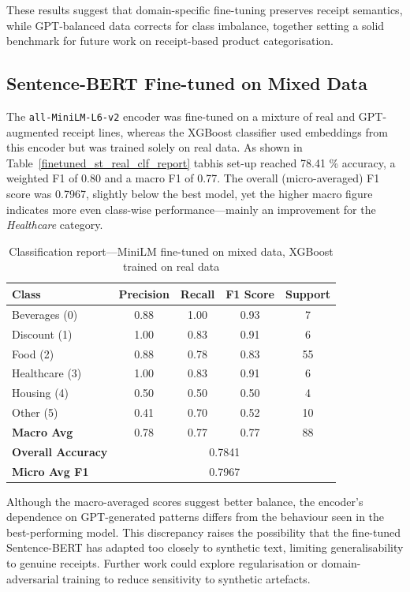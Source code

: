 \documentclass{SGGW-thesis-EN}
\begin{document}
\noindent
These results suggest that domain-specific fine-tuning preserves receipt semantics, while GPT-balanced data corrects
for class imbalance, together setting a solid benchmark for future work on receipt-based product categorisation.

\subsection{Sentence-BERT Fine-tuned on Mixed Data}
The \texttt{all-MiniLM-L6-v2} encoder was fine-tuned on a mixture of real and GPT-augmented receipt lines, whereas the
XGBoost classifier used embeddings from this encoder but was trained solely on real data. As shown in Table~\ref{finetuned_st_real_clf_report} tabhis set-up reached
78.41 \% accuracy, a weighted F1 of 0.80 and a macro F1 of 0.77. The overall
(micro-averaged) F1 score was 0.7967, slightly below the best model, yet the higher macro figure
indicates more even class-wise performance—mainly an improvement for the \emph{Healthcare} category.

\begin{table}
  \centering
  \caption{Classification report—MiniLM fine-tuned on mixed data, XGBoost trained on real data}
  \label{tab:finetuned_st_real_clf_report}
  \begin{tabularx}{\textwidth}{lcccc}
    \toprule
    \textbf{Class} & \textbf{Precision} & \textbf{Recall} & \textbf{F1 Score} & \textbf{Support} \\
    \midrule
    Beverages (0)  & 0.88 & 1.00 & 0.93 & 7  \\
    Discount  (1)  & 1.00 & 0.83 & 0.91 & 6  \\
    Food      (2)  & 0.88 & 0.78 & 0.83 & 55 \\
    Healthcare (3) & 1.00 & 0.83 & 0.91 & 6  \\
    Housing    (4) & 0.50 & 0.50 & 0.50 & 4  \\
    Other      (5) & 0.41 & 0.70 & 0.52 & 10 \\
    \midrule
    \textbf{Macro Avg}        & 0.78 & 0.77 & 0.77 & 88 \\
    \textbf{Overall Accuracy} & \multicolumn{4}{c}{0.7841} \\
    \textbf{Micro Avg F1}     & \multicolumn{4}{c}{0.7967} \\
    \bottomrule
  \end{tabularx}
\end{table}
\noindent Although the macro-averaged scores suggest better balance, the encoder’s dependence on GPT-generated patterns differs
from the behaviour seen in the best-performing model. This discrepancy raises the possibility that the fine-tuned
Sentence-BERT has adapted too closely to synthetic text, limiting generalisability to genuine receipts. Further work
could explore regularisation or domain-adversarial training to reduce sensitivity to synthetic artefacts.
\end{document}
